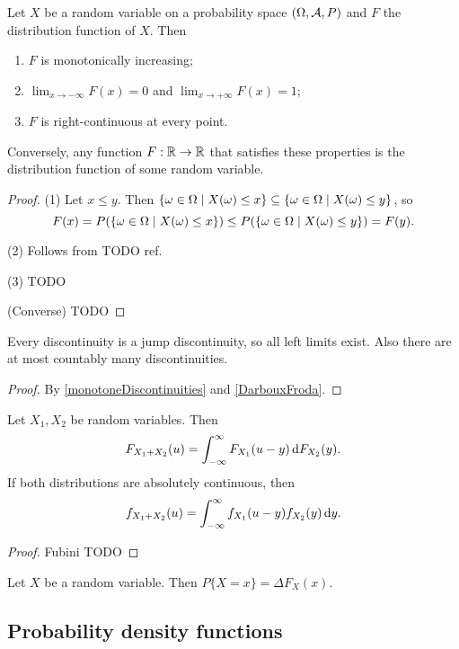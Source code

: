\begin{proposition}
Let $X$ be a random variable on a probability space $\sSet{\Omega, \mathcal{A}, P}$ and $F$ the distribution function of $X$. Then
\begin{enumerate}
\item $F$ is monotonically increasing;
\item $\lim_{x\to-\infty} F(x) = 0$ and $\lim_{x\to+\infty} F(x) = 1$; 
\item $F$ is right-continuous at every point.
\end{enumerate}
Conversely, any function $F:\mathbb{R}\to\mathbb{R}$ that satisfies these properties is the distribution function of some random variable.
\end{proposition}
\begin{proof}
(1) Let $x\leq y$. Then $\setbuilder{\omega\in \Omega}{X(\omega) \leq x} \subseteq \setbuilder{\omega\in \Omega}{X(\omega) \leq y}$, so
\[ F(x) =  P(\setbuilder{\omega\in \Omega}{X(\omega) \leq x}) \leq  P(\setbuilder{\omega\in \Omega}{X(\omega) \leq y}) = F(y). \]

(2) Follows from TODO ref.

(3) TODO

(Converse) TODO
\end{proof}
\begin{corollary}
Every discontinuity is a jump discontinuity, so all left limits exist. Also there are at most countably many discontinuities.
\end{corollary}
\begin{proof}
By \ref{monotoneDiscontinuities} and \ref{DarbouxFroda}.
\end{proof}

\begin{proposition}
Let $X_1, X_2$ be random variables. Then
\[ F_{X_1+X_2}(u) = \int_{-\infty}^\infty F_{X_1}(u-y)\operatorname{d \!}{F_{X_2}(y)}. \]
If both distributions are absolutely continuous, then
\[ f_{X_1+X_2}(u) = \int_{-\infty}^\infty f_{X_1}(u-y)f_{X_2}(y)\operatorname{d \!}{y}. \]
\end{proposition}
\begin{proof}
Fubini TODO
\end{proof}

\begin{lemma}
Let $X$ be a random variable. Then $P\{X = x\} = \Delta F_X(x)$.
\end{lemma}

\subsection{Probability density functions}

